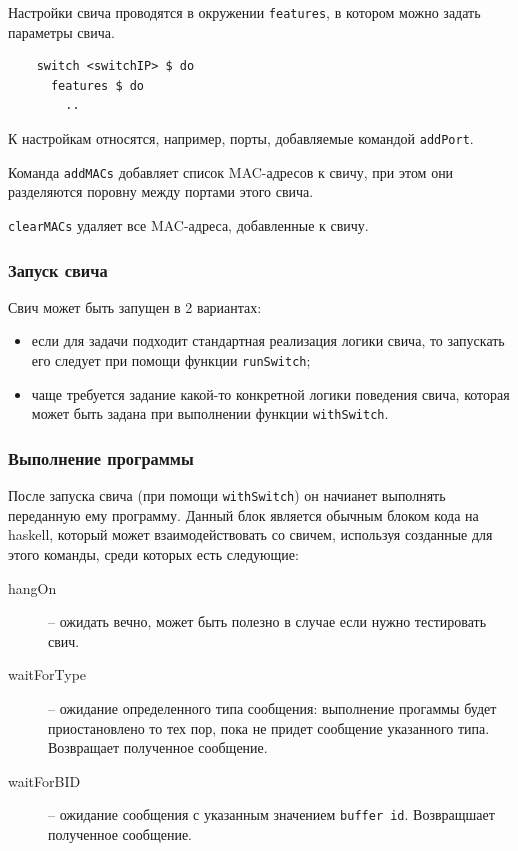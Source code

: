 \documentclass[9pt,a4paper]{article}
\begin{document}
Настройки свича проводятся в окружении \lstinline!features!, в котором можно
задать параметры свича.

\begin{lstlisting}
    switch <switchIP> $ do
      features $ do
        ..
\end{lstlisting}

К настройкам относятся, например, порты, добавляемые командой
\lstinline!addPort!.

Команда \lstinline!addMACs! добавляет список MAC-адресов к свичу, при этом они
разделяются поровну между портами этого свича.

\lstinline!clearMACs! удаляет все MAC-адреса, добавленные к свичу.


\subsubsection{Запуск свича}

Свич может быть запущен в 2 вариантах:

\begin{itemize}
  \item если для задачи подходит стандартная реализация логики свича, то
    запускать его следует при помощи функции \lstinline!runSwitch!;
  \item чаще требуется задание какой-то конкретной логики поведения свича,
    которая может быть задана при выполнении функции \lstinline!withSwitch!.
\end{itemize}


\subsubsection{Выполнение программы}
После запуска свича (при помощи \lstinline!withSwitch!) он начианет выполнять
переданную ему программу. Данный блок является обычным блоком кода на haskell,
который может взаимодействовать со свичем, используя созданные для этого
команды, среди которых есть следующие:

\begin{description}
  \item[hangOn] -- ожидать вечно, может быть полезно в случае если нужно
    тестировать свич.

  \item[waitForType] -- ожидание определенного типа сообщения: выполнение
    прогаммы будет приостановлено то тех пор, пока не придет сообщение
    указанного типа. Возвращает полученное сообщение.

  \item[waitForBID] -- ожидание сообщения с указанным значением
    \lstinline!buffer id!.  Возвращшает полученное сообщение.

\end{description}
\end{document}
